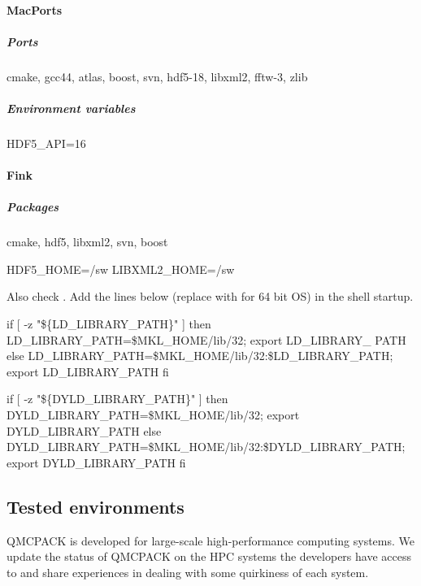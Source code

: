 \paragraph{MacPorts}
\subparagraph{Ports} cmake, gcc44, atlas, boost, svn, hdf5-18, libxml2, fftw-3, zlib
\subparagraph{Environment variables}
\begin{term}
HDF5_API=16
\end{term}

\paragraph{Fink}
\subparagraph{Packages} cmake, hdf5, libxml2, svn, boost
\begin{term}
HDF5_HOME=/sw
LIBXML2_HOME=/sw
\end{term}
Also check . Add the lines below (replace  with  for 64 bit OS) in the shell startup.

\begin{term}
if [ -z "\$\{LD_LIBRARY_PATH\}" ]
then
  LD_LIBRARY_PATH=\$MKL_HOME/lib/32; export LD_LIBRARY_
PATH
else
  LD_LIBRARY_PATH=\$MKL_HOME/lib/32:\$LD_LIBRARY_PATH; export LD_LIBRARY_PATH
fi

if [ -z "\$\{DYLD_LIBRARY_PATH\}" ]
then
  DYLD_LIBRARY_PATH=\$MKL_HOME/lib/32; export DYLD_LIBRARY_PATH
else
  DYLD_LIBRARY_PATH=\$MKL_HOME/lib/32:\$DYLD_LIBRARY_PATH; export DYLD_LIBRARY_PATH
fi
\end{term}

\subsection{Tested environments}
QMCPACK is developed for large-scale high-performance computing systems. We update the status of QMCPACK on the HPC systems the developers have access to and share experiences in dealing with some quirkiness of each system.

